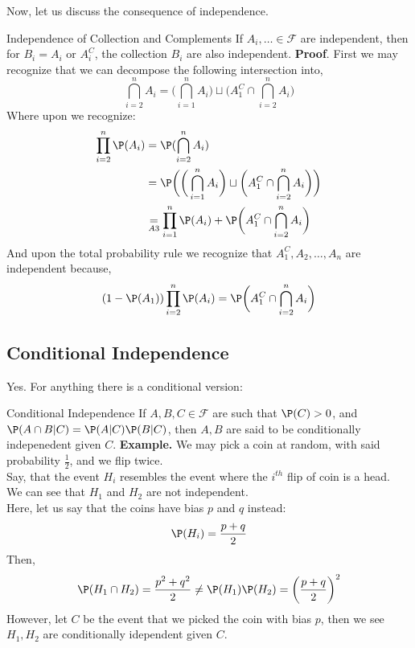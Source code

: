 Now, let us discuss the consequence of independence.
\begin{ln-explain}{Independence of Collection and Complements}{}
    If $A_i, \dots \in \mathcal{F}$ are independent, then for $B_i = A_i \text{ or } A_i^C$, the collection $B_i$ are also independent.
    \tcblower
    \textbf{Proof}. First we may recognize that we can decompose the following intersection into,
    \[
        \bigcap_{i = 2}^n A_i = \bigg( \bigcap_{i = 1}^n A_i \bigg) \sqcup \bigg( A_1^C \cap \bigcap_{i = 2}^n A_i \bigg)
    \]
    Where upon we recognize:
    \begin{align*}
        \prod_{i = 2}^n \P(A_i)
        &= \P(\bigcap_{i = 2}^n A_i) \\
        &= \P \bigg( \bigg( \bigcap_{i = 1}^n A_i \bigg) \sqcup \bigg( A_1^C \cap \bigcap_{i = 2}^n A_i \bigg) \bigg) \\
        &\underset{A3}{=} \prod_{i = 1}^n \P(A_i) + \P \bigg( A_1^C \cap \bigcap_{i = 2}^n A_i \bigg)
    \end{align*}
    And upon the total probability rule we recognize that $A_1^C, A_2, \dots, A_n$ are independent because,
    \[(1 - \P(A_1)) \prod_{i = 2}^n \P(A_i) = \P \bigg( A_1^C \cap \bigcap_{i = 2}^n A_i \bigg)\]
\end{ln-explain}

\subsection{Conditional Independence}
Yes. For anything there is a conditional version:
\begin{ln-define}{Conditional Independence}{}
    If $A, B, C \in \mathcal{F}$ are such that $\P(C) > 0$, and $\P(A \cap B | C) = \P(A | C) \P(B | C)$, then $A, B$ are said to be conditionally indepenedent given $C$.
    \tcblower
    \textbf{Example.} We may pick a coin at random, with said probability $\frac{1}{2}$, and we flip twice. \\
    Say, that the event $H_i$ resembles the event where the $i^{th}$ flip of coin is a head. \\

    We can see that $H_1$ and $H_2$ are not independent. \\
    Here, let us say that the coins have bias $p$ and $q$ instead:
    \[
        \P(H_i) = \frac{p + q}{2}
    \]
    Then,
    \[
        \P(H_1 \cap H_2) = \frac{p^2 + q^2}{2} \neq \P(H_1) \P(H_2) = {\bigg( \frac{p + q}{2} \bigg)}^2
    \]
    However, let $C$ be the event that we picked the coin with bias $p$, then we see $H_1, H_2$ are conditionally idependent given $C$.
\end{ln-define}

